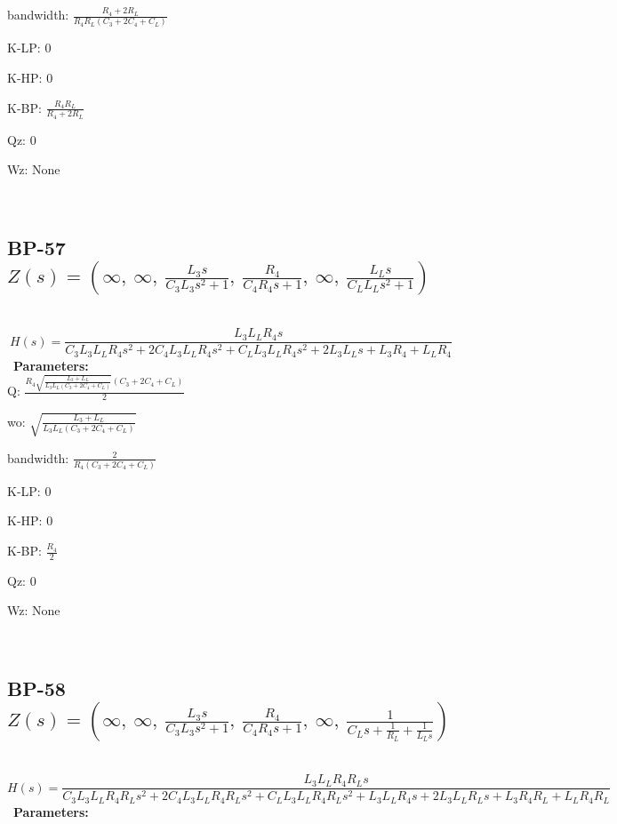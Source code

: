 \documentclass{article}
\begin{document}
bandwidth: $\frac{R_{4} + 2 R_{L}}{R_{4} R_{L} \left(C_{3} + 2 C_{4} + C_{L}\right)}$\ 

K-LP: $0$\ 

K-HP: $0$\ 

K-BP: $\frac{R_{4} R_{L}}{R_{4} + 2 R_{L}}$\ 

Qz: $0$\ 

Wz: $\text{None}$\ 

\ 

\subsection{BP-57 $Z(s) = \left( \infty, \  \infty, \  \frac{L_{3} s}{C_{3} L_{3} s^{2} + 1}, \  \frac{R_{4}}{C_{4} R_{4} s + 1}, \  \infty, \  \frac{L_{L} s}{C_{L} L_{L} s^{2} + 1}\right)$ } \ 
\textbf{\[H(s) = \frac{L_{3} L_{L} R_{4} s}{C_{3} L_{3} L_{L} R_{4} s^{2} + 2 C_{4} L_{3} L_{L} R_{4} s^{2} + C_{L} L_{3} L_{L} R_{4} s^{2} + 2 L_{3} L_{L} s + L_{3} R_{4} + L_{L} R_{4}}\] } \ 
\textbf{Parameters:}\\ 

Q: $\frac{R_{4} \sqrt{\frac{L_{3} + L_{L}}{L_{3} L_{L} \left(C_{3} + 2 C_{4} + C_{L}\right)}} \left(C_{3} + 2 C_{4} + C_{L}\right)}{2}$\ 

wo: $\sqrt{\frac{L_{3} + L_{L}}{L_{3} L_{L} \left(C_{3} + 2 C_{4} + C_{L}\right)}}$\ 

bandwidth: $\frac{2}{R_{4} \left(C_{3} + 2 C_{4} + C_{L}\right)}$\ 

K-LP: $0$\ 

K-HP: $0$\ 

K-BP: $\frac{R_{4}}{2}$\ 

Qz: $0$\ 

Wz: $\text{None}$\ 

\ 

\subsection{BP-58 $Z(s) = \left( \infty, \  \infty, \  \frac{L_{3} s}{C_{3} L_{3} s^{2} + 1}, \  \frac{R_{4}}{C_{4} R_{4} s + 1}, \  \infty, \  \frac{1}{C_{L} s + \frac{1}{R_{L}} + \frac{1}{L_{L} s}}\right)$ } \ 
\textbf{\[H(s) = \frac{L_{3} L_{L} R_{4} R_{L} s}{C_{3} L_{3} L_{L} R_{4} R_{L} s^{2} + 2 C_{4} L_{3} L_{L} R_{4} R_{L} s^{2} + C_{L} L_{3} L_{L} R_{4} R_{L} s^{2} + L_{3} L_{L} R_{4} s + 2 L_{3} L_{L} R_{L} s + L_{3} R_{4} R_{L} + L_{L} R_{4} R_{L}}\] } \ 
\textbf{Parameters:}\\ 
\end{document}
